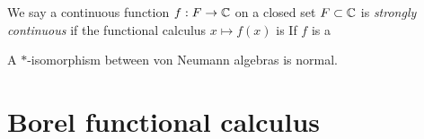 \documentclass{../../large}
\begin{document}
\begin{prb}

We say a continuous function $f:F\to\mathbb{C}$ on a closed set $F\subset\mathbb{C}$ is \emph{strongly continuous} if the functional calculus $x\mapsto f(x)$ is 
If $f$ is a 


A $*$-isomorphism between von Neumann algebras is normal.
\end{prb}



\begin{prb}

\end{prb}



\section{Borel functional calculus}
\end{document}
